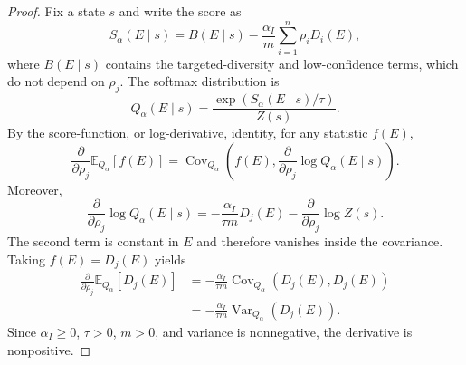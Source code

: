 \begin{proof}
Fix a state $s$ and write the score as
\[
    S_\alpha(E\mid s)
    =
    B(E\mid s)
    -
    \frac{\alpha_I}{m}
    \sum_{i=1}^n \rho_iD_i(E),
\]
where $B(E\mid s)$ contains the targeted-diversity and low-confidence terms,
which do not depend on $\rho_j$. The softmax distribution is
\[
    Q_\alpha(E\mid s)
    =
    \frac{\exp(S_\alpha(E\mid s)/\tau)}{Z(s)}.
\]
By the score-function, or log-derivative, identity, for any statistic $f(E)$,
\[
    \frac{\partial}{\partial \rho_j}
    \mathbb E_{Q_\alpha}[f(E)]
    =
    \operatorname{Cov}_{Q_\alpha}
    \left(
    f(E),
    \frac{\partial}{\partial\rho_j}
    \log Q_\alpha(E\mid s)
    \right).
\]
Moreover,
\[
    \frac{\partial}{\partial\rho_j}
    \log Q_\alpha(E\mid s)
    =
    -
    \frac{\alpha_I}{\tau m}D_j(E)
    -
    \frac{\partial}{\partial\rho_j}\log Z(s).
\]
The second term is constant in $E$ and therefore vanishes inside the covariance.
Taking $f(E)=D_j(E)$ yields
\[
\begin{aligned}
    \frac{\partial}{\partial \rho_j}
    \mathbb E_{Q_\alpha}[D_j(E)]
    &=
    -
    \frac{\alpha_I}{\tau m}
    \operatorname{Cov}_{Q_\alpha}(D_j(E),D_j(E))\\
    &=
    -
    \frac{\alpha_I}{\tau m}
    \operatorname{Var}_{Q_\alpha}(D_j(E)).
\end{aligned}
\]
Since $\alpha_I\ge0$, $\tau>0$, $m>0$, and variance is nonnegative, the
derivative is nonpositive.
\end{proof}